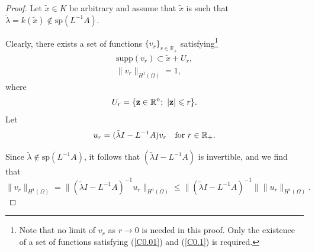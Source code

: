 \documentclass{imanum}
\begin{document}
\begin{proof}
Let $\tilde x \in K$ be arbitrary and assume that $\tilde x$ is
such that
$\tilde \lambda = k(\tilde x) \not\in \mathrm{sp}(L^{-1}A)$.

Clearly, there exists a set of functions
$\{ v_r \}_{r \in \mathbb{R}_{+}}$
satisfying\footnote{Note that no limit of $v_r$ as $r \rightarrow 0$
is needed in this proof. Only the existence of a set of functions
satisfying (\ref{C0.01}) and (\ref{C0.1}) is required.}
\begin{gather}
\mathrm{supp}(v_r) \subset \tilde x + U_r,
\label{C0.01}\\[3pt]
\parallel\! v_r \!\parallel_{H^1(\Omega)} = 1 ,
\label{C0.1}
\end{gather}
where
\begin{equation*}
U_r = \{ {\bf z} \in \mathbb{R}^n;\ |{\bf z}| \leq r \}.
\end{equation*}
Let
\begin{equation}
u_r = (\tilde \lambda I-L^{-1}A) v_r
\quad \hbox{for}\ r \in \mathbb{R}_+.
\label{C1}
\end{equation}

Since $\tilde \lambda \not \in \mathrm{sp}(L^{-1}A)$, it
follows that $(\tilde \lambda I-L^{-1}A)$ is invertible, and we
find that
\begin{equation}
\parallel\! v_r \!\parallel_{H^1(\Omega)}
=
\parallel\! (\tilde \lambda I-L^{-1}A)^{-1} u_{r}
\!\parallel_{H^1(\Omega)}
\leq \| (\tilde \lambda I-L^{-1}A)^{-1} \|
\parallel\! u_r \!\parallel_{H^1(\Omega)} .
\label{C2}
\end{equation}


\end{proof}
\end{document}

